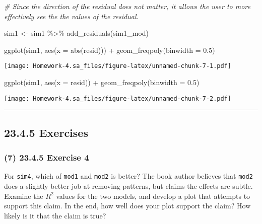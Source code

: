 \documentclass[
]{article}
\newenvironment{Shaded}{\begin{snugshade}}{\end{snugshade}}
\newcommand{\AttributeTok}[1]{\textcolor[rgb]{0.77,0.63,0.00}{#1}}
\newcommand{\CommentTok}[1]{\textcolor[rgb]{0.56,0.35,0.01}{\textit{#1}}}
\newcommand{\FloatTok}[1]{\textcolor[rgb]{0.00,0.00,0.81}{#1}}
\newcommand{\FunctionTok}[1]{\textcolor[rgb]{0.00,0.00,0.00}{#1}}
\newcommand{\NormalTok}[1]{#1}
\newcommand{\OtherTok}[1]{\textcolor[rgb]{0.56,0.35,0.01}{#1}}
\newcommand{\SpecialCharTok}[1]{\textcolor[rgb]{0.00,0.00,0.00}{#1}}
\begin{document}
\begin{Shaded}
\begin{Highlighting}[]
\CommentTok{\# Since the direction of the residual does not matter, it allows the user to more effectively see the the values of the residual.}


\NormalTok{sim1 }\OtherTok{\textless{}{-}}\NormalTok{ sim1 }\SpecialCharTok{\%\textgreater{}\%}
  \FunctionTok{add\_residuals}\NormalTok{(sim1\_mod)}

\FunctionTok{ggplot}\NormalTok{(sim1, }\FunctionTok{aes}\NormalTok{(}\AttributeTok{x =} \FunctionTok{abs}\NormalTok{(resid))) }\SpecialCharTok{+}
  \FunctionTok{geom\_freqpoly}\NormalTok{(}\AttributeTok{binwidth =} \FloatTok{0.5}\NormalTok{)}
\end{Highlighting}
\end{Shaded}

\texttt{[image: Homework-4.sa\_files/figure-latex/unnamed-chunk-7-1.pdf]}

\begin{Shaded}
\begin{Highlighting}[]
\FunctionTok{ggplot}\NormalTok{(sim1, }\FunctionTok{aes}\NormalTok{(}\AttributeTok{x =}\NormalTok{ resid)) }\SpecialCharTok{+}
  \FunctionTok{geom\_freqpoly}\NormalTok{(}\AttributeTok{binwidth =} \FloatTok{0.5}\NormalTok{)}
\end{Highlighting}
\end{Shaded}

\texttt{[image: Homework-4.sa\_files/figure-latex/unnamed-chunk-7-2.pdf]}

\begin{center}\rule{0.5\linewidth}{0.5pt}\end{center}

\hypertarget{exercises-2}{%
\subsection{23.4.5 Exercises}\label{exercises-2}}

\hypertarget{exercise-4-1}{%
\subsubsection{(7) 23.4.5 Exercise 4}\label{exercise-4-1}}

For \texttt{sim4}, which of \texttt{mod1} and \texttt{mod2} is better?
The book author believes that \texttt{mod2} does a slightly better job
at removing patterns, but claims the effects are subtle. Examine the
\(R^2\) values for the two models, and develop a plot that attempts to
support this claim. In the end, how well does your plot support the
claim? How likely is it that the claim is true?
\end{document}
